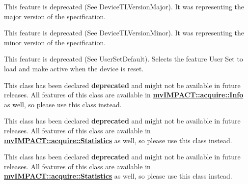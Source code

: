 \begin{DoxyRefList}
\item[\label{deprecated__deprecated000057}%
\hypertarget{deprecated__deprecated000057}{}%
成员 \hyperlink{classmv_i_m_p_a_c_t_1_1acquire_1_1_gen_i_cam_1_1_transport_layer_control_ad050c03e7fa774908de735b1f0babd6a}{mv\+I\+M\+P\+A\+C\+T\+:\+:acquire\+:\+:Gen\+I\+Cam\+:\+:Transport\+Layer\+Control\+:\+:gev\+Version\+Major} ]This feature is deprecated (See Device\+T\+L\+Version\+Major). It was representing the major version of the specification.  
\item[\label{deprecated__deprecated000058}%
\hypertarget{deprecated__deprecated000058}{}%
成员 \hyperlink{classmv_i_m_p_a_c_t_1_1acquire_1_1_gen_i_cam_1_1_transport_layer_control_a14681ac25aa9a0c4b6e1863645d4e156}{mv\+I\+M\+P\+A\+C\+T\+:\+:acquire\+:\+:Gen\+I\+Cam\+:\+:Transport\+Layer\+Control\+:\+:gev\+Version\+Minor} ]This feature is deprecated (See Device\+T\+L\+Version\+Minor). It was representing the minor version of the specification.  
\item[\label{deprecated__deprecated000054}%
\hypertarget{deprecated__deprecated000054}{}%
成员 \hyperlink{classmv_i_m_p_a_c_t_1_1acquire_1_1_gen_i_cam_1_1_user_set_control_a08d0aaa8f50249724bf888794adf1713}{mv\+I\+M\+P\+A\+C\+T\+:\+:acquire\+:\+:Gen\+I\+Cam\+:\+:User\+Set\+Control\+:\+:user\+Set\+Default\+Selector} ]This feature is deprecated (See User\+Set\+Default). Selects the feature User Set to load and make active when the device is reset. 
\item[\label{deprecated__deprecated000008}%
\hypertarget{deprecated__deprecated000008}{}%
成员 \hyperlink{group___common_interface_ga3066c4f348d9374a48618855a5797dc9}{mv\+I\+M\+P\+A\+C\+T\+:\+:acquire\+:\+:M\+V\+I\+M\+P\+A\+C\+T\+\_\+\+D\+E\+P\+R\+E\+C\+A\+T\+E\+D\+\_\+\+C\+P\+P} (Info\+Base)]This class has been declared {\bfseries deprecated} and might not be available in future releases. All features of this class are available in {\bfseries \hyperlink{classmv_i_m_p_a_c_t_1_1acquire_1_1_info}{mv\+I\+M\+P\+A\+C\+T\+::acquire\+::\+Info}} as well, so please use this class instead. 

This class has been declared {\bfseries deprecated} and might not be available in future releases. All features of this class are available in {\bfseries \hyperlink{classmv_i_m_p_a_c_t_1_1acquire_1_1_statistics}{mv\+I\+M\+P\+A\+C\+T\+::acquire\+::\+Statistics}} as well, so please use this class instead. 

This class has been declared {\bfseries deprecated} and might not be available in future releases. All features of this class are available in {\bfseries \hyperlink{classmv_i_m_p_a_c_t_1_1acquire_1_1_statistics}{mv\+I\+M\+P\+A\+C\+T\+::acquire\+::\+Statistics}} as well, so please use this class instead. 


\end{DoxyRefList}
